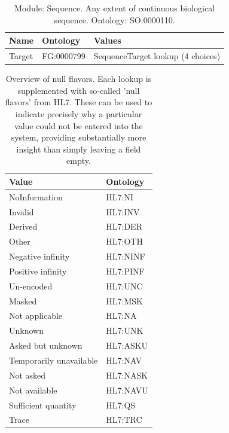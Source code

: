 \documentclass{article}
\begin{document}
\begin{table}[htb]
\begin{tabular}{lll}
Name & Ontology & Values \\
\hline
Target & FG:0000799 & SequenceTarget lookup (4 choices) \\
\hline
\end{tabular}
\caption[Module: Sequence]{\label{table:table15} Module: Sequence. Any extent of continuous biological sequence. Ontology: SO:0000110. }
\end{table}

\begin{table}[htb]
\begin{tabular}{ll}
Value & Ontology \\
\hline
NoInformation & HL7:NI \\
Invalid & HL7:INV \\
Derived & HL7:DER \\
Other & HL7:OTH \\
Negative infinity & HL7:NINF \\
Positive infinity & HL7:PINF \\
Un-encoded & HL7:UNC \\
Masked & HL7:MSK \\
Not applicable & HL7:NA \\
Unknown & HL7:UNK \\
Asked but unknown & HL7:ASKU \\
Temporarily unavailable & HL7:NAV \\
Not asked & HL7:NASK \\
Not available & HL7:NAVU \\
Sufficient quantity & HL7:QS \\
Trace & HL7:TRC \\
\hline
\end{tabular}
\caption[NullFlavors]{\label{table:table16} Overview of null flavors. Each lookup is supplemented with so-called 'null flavors' from HL7. These can be used to indicate precisely why a particular value could not be entered into the system, providing substantially more insight than simply leaving a field empty. }
\end{table}
\end{document}
